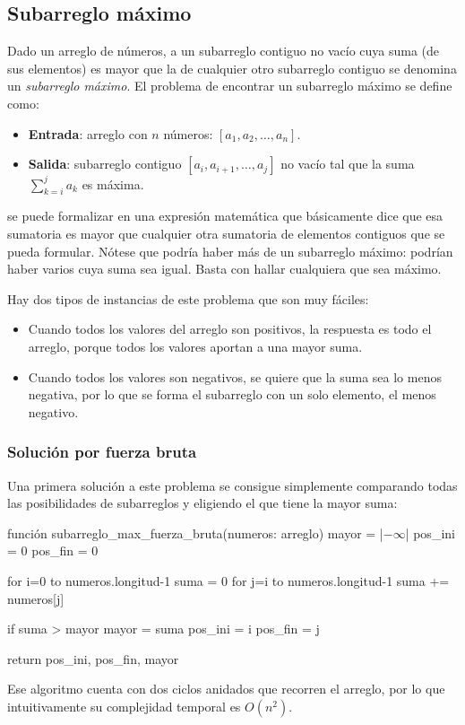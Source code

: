 \subsection{Subarreglo máximo}

Dado un arreglo de números, a un subarreglo contiguo no vacío cuya suma (de sus elementos) es mayor que la de cualquier otro subarreglo contiguo se denomina un \emph{subarreglo máximo}. El problema de encontrar un subarreglo máximo se define como:
\begin{itemize}
  \item \textbf{Entrada}: arreglo con $n$ números: $[a_1, a_2,\ldots,a_n]$.
  \item \textbf{Salida}: subarreglo contiguo $[a_i, a_{i+1},\ldots,a_j]$ no vacío tal que la suma $\sum_{k=i}^j a_k$ es máxima.
\end{itemize}
 se puede formalizar en una expresión matemática que básicamente dice que esa sumatoria es mayor que cualquier otra sumatoria de elementos contiguos que se pueda formular. Nótese que podría haber más de un subarreglo máximo: podrían haber varios cuya suma sea igual. Basta con hallar cualquiera que sea máximo.

Hay dos tipos de instancias de este problema que son muy fáciles:
\begin{itemize}
  \item Cuando todos los valores del arreglo son positivos, la respuesta es todo el arreglo, porque todos los valores aportan a una mayor suma.
  \item Cuando todos los valores son negativos, se quiere que la suma sea lo menos negativa, por lo que se forma el subarreglo con un solo elemento, el menos negativo.
\end{itemize}

\subsubsection{Solución por fuerza bruta}

Una primera solución a este problema se consigue simplemente comparando todas las posibilidades de subarreglos y eligiendo el que tiene la mayor suma:
\begin{pseudocode}
función subarreglo_max_fuerza_bruta(numeros: arreglo)
    mayor = |$-\infty$|
    pos_ini = 0
    pos_fin = 0

    for i=0 to numeros.longitud-1
        suma = 0
        for j=i to numeros.longitud-1
            suma += numeros[j]

            if suma > mayor
                mayor = suma
                pos_ini = i
                pos_fin = j

    return pos_ini, pos_fin, mayor
\end{pseudocode}
Ese algoritmo cuenta con dos ciclos anidados que recorren el arreglo, por lo que intuitivamente su complejidad temporal es $O(n^2)$.

